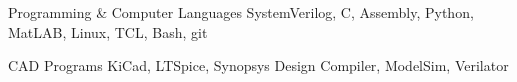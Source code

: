 

\begin{cvhonors}

  \cvhonor
    {Programming \& Computer Languages} %
    {SystemVerilog, C, Assembly, Python, MatLAB,  Linux, TCL, Bash, git} %
    {}
    {}



  \cvhonor
    {CAD Programs} %
    {KiCad, LTSpice, Synopsys Design Compiler, ModelSim, Verilator}
    {}
    {}

\end{cvhonors}
